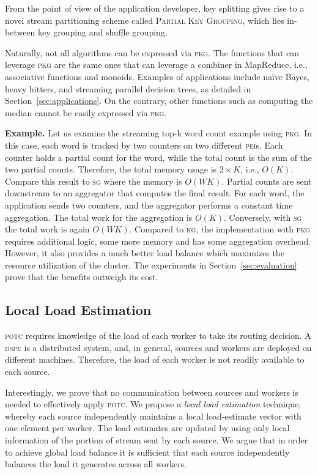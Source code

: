 \documentclass[10pt,conference,letterpaper]{IEEEtran}
\newcommand{\spara}[1]{\smallskip\noindent\textbf{#1}}
\newcommand{\pei}{\textsc{pei}\xspace}
\newcommand{\peis}{{\pei}s\xspace}
\newcommand{\potc}{\textsc{p\textup{o}tc}\xspace}
\newcommand{\dspe}{\textsc{dspe}\xspace}
\newcommand{\pkg}{\textsc{Partial Key Grouping}\xspace}
\newcommand{\pkgs}{\textsc{pkg}\xspace}
\newcommand{\kg}{\textsc{kg}\xspace}
\newcommand{\sg}{\textsc{sg}\xspace}
\begin{document}
From the point of view of the application developer, key splitting gives rise to  a novel stream partitioning scheme called \pkg, which lies in-between key grouping and shuffle grouping.


Naturally, not all algorithms can be expressed via \pkgs.
The functions that can leverage \pkgs are the same ones that can leverage a combiner in MapReduce, i.e., associative functions and monoids.
Examples of applications include na\"{i}ve Bayes, heavy hitters, and streaming parallel decision trees, as detailed in Section~\ref{sec:applications}.
On the contrary, other functions such as computing the median cannot be easily expressed via \pkgs.




\spara{Example.}
Let us examine the streaming top-k word count example using \pkgs.
In this case, each word is tracked by two counters on two different \peis. Each counter holds a partial count for the word, while the total count is the sum of the two partial counts.
Therefore, the total memory usage is $2 \times K$, i.e., $O(K)$.
Compare this result to \sg where the memory is $O(WK)$.
Partial counts are sent downstream to an aggregator that computes the final result.
For each word, the application sends two counters, and the aggregator performs a constant time aggregation.
The total work for the aggregation is $O(K)$.
Conversely, with \sg the total work is again $O(WK)$.
Compared to \kg, the implementation with \pkgs requires additional logic, some more memory and has some aggregation overhead.
However, it also provides a much better load balance which maximizes the resource utilization of the cluster.
The experiments in Section~\ref{sec:evaluation} prove that the benefits outweigh its cost.







	



\subsection{Local Load Estimation}
\potc requires knowledge of the load of each worker to take its routing decision.
A \dspe is a distributed system, and, in general, sources and workers are deployed on different machines.
Therefore, the load of each worker is not readily available to each source.



Interestingly, we prove that no communication between sources and workers is needed to effectively apply \potc.
We propose a \emph{local load estimation} technique, whereby each source independently maintains a local load-estimate vector with one element per worker.
The load estimates are updated by using only local information of the portion of stream sent by each source.
We argue that in order to achieve global load balance it is sufficient that each source independently balances the load it generates across all workers.
\end{document}
